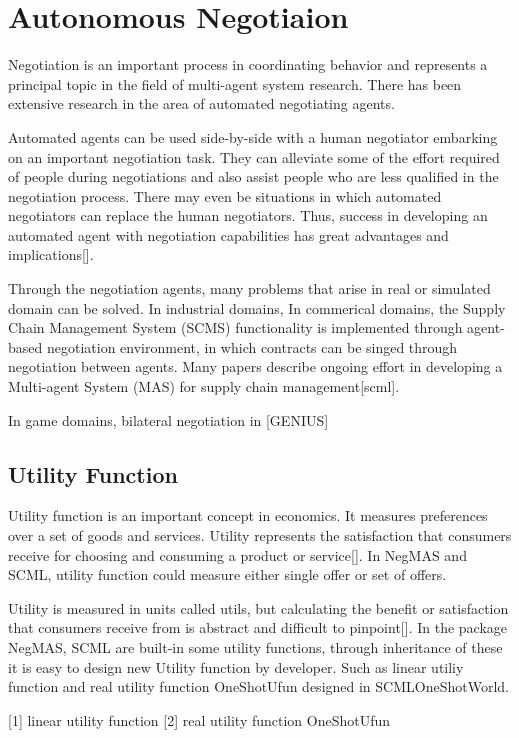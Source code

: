 \section{Autonomous Negotiaion} \label{autonomous-negotiation}
Negotiation is an important process in coordinating behavior and represents a principal topic in the field of multi-agent system research. There has been extensive research in the area of automated negotiating agents. 

Automated agents can be used side-by-side with a human negotiator embarking on an important negotiation task. They can alleviate some of the effort required of people during negotiations and also assist people who are less qualified in the negotiation process. There may even be situations in which automated negotiators can replace the human negotiators. Thus, success in developing an automated agent with negotiation capabilities
has great advantages and implications[].

Through the negotiation agents, many problems that arise in real or simulated domain can be solved. 
In industrial domains, 
In commerical  domains, the Supply Chain Management System (SCMS)
functionality is implemented through agent-based negotiation environment, in which contracts can be singed through negotiation between agents. Many papers describe ongoing effort in developing a Multi-agent System (MAS) for supply chain management[\gls{scml}].

In game domains, bilateral negotiation in [GENIUS]

\subsection{Utility Function}
Utility function is an important concept in economics. It measures preferences over a set of goods and services. Utility represents the satisfaction that consumers receive for choosing and consuming a product or service[]. In NegMAS and SCML, utility function could measure either single offer or set of offers.

Utility is measured in units called utils, but calculating the benefit or satisfaction that consumers receive from is abstract and difficult to pinpoint[]. In the package NegMAS, SCML are built-in some utility functions, through inheritance of these it is easy to design new Utility function by developer. Such as linear utiliy function and real utility function OneShotUfun designed in SCMLOneShotWorld.

[1] linear utility function
[2] real utility function OneShotUfun

